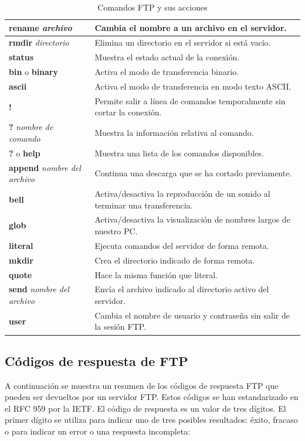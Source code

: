 \documentclass[a4paper, 12pt]{article}
\begin{document}
\begin{table}[ht]
\begin{tabular}{|p{4cm}|p{10cm}|}
\textbf{rename} \textit{archivo} & Cambia el nombre a un archivo en el servidor. \\ \hline
\textbf{rmdir} \textit{directorio} & Elimina un directorio en el servidor si está vacío. \\ \hline
\textbf{status} & Muestra el estado actual de la conexión. \\ \hline
\textbf{bin} o \textbf{binary} & Activa el modo de transferencia binario. \\ \hline
\textbf{ascii} & Activa el modo de transferencia en modo texto ASCII. \\ \hline
\textbf{!} & Permite salir a línea de comandos temporalmente sin cortar la conexión. \\ \hline
\textbf{?} \textit{nombre de comando} & Muestra la información relativa al comando. \\ \hline
\textbf{?} o \textbf{help} & Muestra una lista de los comandos disponibles. \\ \hline
\textbf{append} \textit{nombre del archivo} & Continua una descarga que se ha cortado previamente. \\ \hline
\textbf{bell} & Activa/desactiva la reproducción de un sonido al terminar una transferencia. \\ \hline
\textbf{glob} & Activa/desactiva la visualización de nombres largos de nuestro PC. \\ \hline
\textbf{literal} & Ejecuta comandos del servidor de forma remota. \\ \hline
\textbf{mkdir} & Crea el directorio indicado de forma remota. \\ \hline
\textbf{quote} & Hace la misma función que literal. \\ \hline
\textbf{send} \textit{nombre del archivo} & Envía el archivo indicado al directorio activo del servidor. \\ \hline
\textbf{user} & Cambia el nombre de usuario y contraseña sin salir de la sesión FTP. \\ \hline
\end{tabular}
\caption{Comandos FTP y sus acciones}
\label{tab:comandos_ftp}
\end{table}

\subsection{Códigos de respuesta de FTP}
A continuación se muestra un resumen de los códigos de respuesta FTP que pueden ser devueltos por un servidor FTP. Estos códigos se han estandarizado en el RFC 959 por la IETF. El código de respuesta es un valor de tres dígitos. El primer dígito se utiliza para indicar uno de tres posibles resultados: éxito, fracaso o para indicar un error o una respuesta incompleta:
\end{document}
